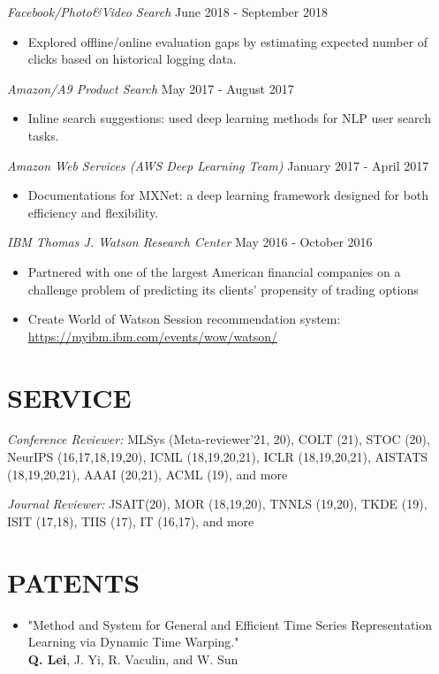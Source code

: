 \documentclass[margin, 10pt]{res} %
\begin{document}
\begin{resume}
{\sl Facebook/Photo\&Video Search} \hfill June 2018 - September 2018
\begin{itemize}
  \item Explored offline/online evaluation gaps by estimating expected number of 
    clicks based on historical logging data.
\end{itemize}
{\sl Amazon/A9 Product Search} \hfill May 2017 - August 2017
\begin{itemize}
  \item Inline search suggestions: used deep learning methods for NLP user 
    search tasks.
\end{itemize}
{\sl Amazon Web Services (AWS Deep Learning Team)} \hfill January 2017 - April 2017
\begin{itemize}
  \item Documentations for MXNet: a deep learning framework designed for 
    both efficiency and flexibility.
  \end{itemize}
{\sl IBM Thomas J. Watson Research Center} \hfill May 2016 - October 2016
\begin{itemize}
\item  %
  Partnered with one of the largest American financial companies on a challenge problem of predicting its clients' propensity of trading options
\item Create World of Watson Session recommendation system:\\
  \url{https://myibm.ibm.com/events/wow/watson/}
\end{itemize} 


\section{SERVICE}
{\sl Conference Reviewer:} MLSys (Meta-reviewer'21, 20), COLT (21), STOC (20), NeurIPS (16,17,18,19,20), ICML (18,19,20,21), ICLR (18,19,20,21), 
AISTATS (18,19,20,21), AAAI (20,21), ACML (19), and more

{\sl Journal Reviewer:} JSAIT(20), MOR (18,19,20), TNNLS (19,20), TKDE (19), ISIT (17,18), TIIS (17), 
IT (16,17), and more


\section{PATENTS}\begin{itemize}
 \item{"Method and System for General and Efficient Time Series Representation 
     Learning via Dynamic Time Warping."\\
   \textbf{Q. Lei}, J. Yi, R. Vaculin, and W. Sun}


\end{itemize}
\end{resume}
\end{document}
